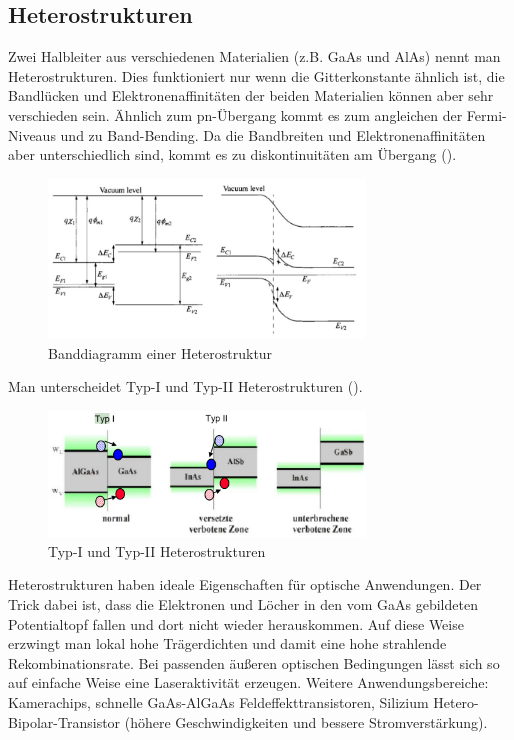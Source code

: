 \subsection{Heterostrukturen }\label{k5:heterostrukturen}

Zwei Halbleiter aus verschiedenen Materialien (z.B. GaAs und AlAs) nennt man Heterostrukturen.
Dies funktioniert nur wenn die Gitterkonstante ähnlich ist, die Bandlücken und Elektronenaffinitäten der beiden
Materialien können aber sehr verschieden sein.
Ähnlich zum pn-Übergang kommt es zum angleichen der Fermi-Niveaus und zu Band-Bending.
Da die Bandbreiten und Elektronenaffinitäten aber unterschiedlich sind, kommt es zu diskontinuitäten am Übergang
().
\begin{figure}[h]
    \centering
    \includegraphics[width=0.75\textwidth]{fig/heteroBand}
    \caption{Banddiagramm einer Heterostruktur}
    \label{fig:heteroBand}
\end{figure}

Man unterscheidet Typ-I und Typ-II Heterostrukturen ().
\begin{figure}[h]
    \centering
    \includegraphics[width=0.75\textwidth]{fig/heteroUnterschied}
    \caption{Typ-I und Typ-II Heterostrukturen}
    \label{fig:heteroUnterschied}
\end{figure}

Heterostrukturen haben ideale Eigenschaften für optische Anwendungen.
Der Trick dabei ist, dass die Elektronen und Löcher in den vom GaAs
gebildeten Potentialtopf fallen und dort nicht wieder herauskommen. Auf diese
Weise erzwingt man lokal hohe Trägerdichten und damit eine hohe strahlende
Rekombinationsrate. Bei passenden äußeren optischen Bedingungen lässt sich
so auf einfache Weise eine Laseraktivität erzeugen.
Weitere Anwendungsbereiche: Kamerachips, schnelle GaAs-AlGaAs Feldeffekttransistoren,
Silizium Hetero-Bipolar-Transistor (höhere Geschwindigkeiten und bessere Stromverstärkung).

